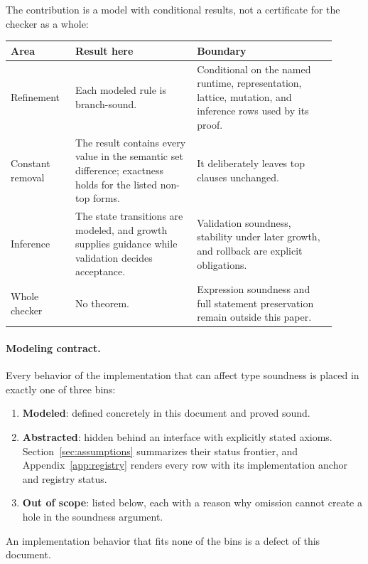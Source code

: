 \documentclass[11pt]{article}
\begin{document}
The contribution is a model with conditional results, not a certificate for
the checker as a whole:

\begin{keydef}
\renewcommand{\arraystretch}{1.2}
\small
\begin{tabular}{@{}>{\raggedright\arraybackslash}p{0.18\linewidth}
                    >{\raggedright\arraybackslash}p{0.34\linewidth}
                    >{\raggedright\arraybackslash}p{0.39\linewidth}@{}}
\toprule
\textbf{Area} & \textbf{Result here} & \textbf{Boundary} \\
\midrule
Refinement & Each modeled rule is branch-sound. & Conditional on the named
  runtime, representation, lattice, mutation, and inference rows used by its
  proof. \\
Constant removal & The result contains every value in the semantic set
  difference; exactness holds for the listed non-top forms. & It deliberately
  leaves top clauses unchanged. \\
Inference & The state transitions are modeled, and growth supplies guidance
  while validation decides acceptance. & Validation soundness, stability under
  later growth, and rollback are explicit obligations. \\
Whole checker & No theorem. & Expression soundness and full statement
  preservation remain outside this paper. \\
\bottomrule
\end{tabular}
\end{keydef}

\paragraph{Modeling contract.}
Every behavior of the implementation that can affect type soundness is placed
in exactly one of three bins:
\begin{enumerate}
\item \textbf{Modeled}: defined concretely in this document and proved sound.
\item \textbf{Abstracted}: hidden behind an interface with explicitly stated
  axioms. Section~\ref{sec:assumptions} summarizes their status frontier, and
  Appendix~\ref{app:registry} renders every row with its implementation anchor
  and registry status.
\item \textbf{Out of scope}: listed below, each with a reason why omission
  cannot create a hole in the soundness argument.
\end{enumerate}
An implementation behavior that fits none of the bins is a defect of this
document.
\end{document}

